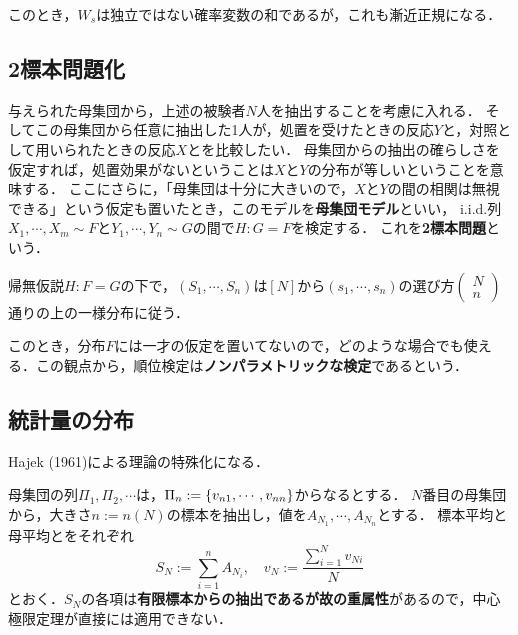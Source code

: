 \documentclass[uplatex,dvipdfmx]{jsreport}
\begin{document}
このとき，$W_s$は独立ではない確率変数の和であるが，これも漸近正規になる．

\subsection{2標本問題化}

与えられた母集団から，上述の被験者$N$人を抽出することを考慮に入れる．
そしてこの母集団から任意に抽出した1人が，処置を受けたときの反応$Y$と，対照として用いられたときの反応$X$とを比較したい．
母集団からの抽出の確らしさを仮定すれば，処置効果がないということは$X$と$Y$の分布が等しいということを意味する．
ここにさらに，「母集団は十分に大きいので，$X$と$Y$の間の相関は無視できる」という仮定も置いたとき，このモデルを\textbf{母集団モデル}といい，
i.i.d.列$X_1,\cdots,X_m\sim F$と$Y_1,\cdots,Y_n\sim G$の間で$H:G=F$を検定する．
これを\textbf{2標本問題}という．

\begin{theorem}
    帰無仮説$H:F=G$の下で，$(S_1,\cdots,S_n)$は$[N]$から$(s_1,\cdots,s_n)$の選び方$\begin{pmatrix}N\\n\end{pmatrix}$通りの上の一様分布に従う．
\end{theorem}

\begin{remark}
    このとき，分布$F$には一才の仮定を置いてないので，どのような場合でも使える．この観点から，順位検定は\textbf{ノンパラメトリックな検定}であるという．
\end{remark}

\subsection{統計量の分布}

\begin{tcolorbox}[colframe=ForestGreen, colback=ForestGreen!10!white,breakable,colbacktitle=ForestGreen!40!white,coltitle=black,fonttitle=\bfseries\sffamily,
title=]
    Hajek (1961)による理論の特殊化になる．
\end{tcolorbox}

\begin{notation}
    母集団の列$\Pi_1,\Pi_2,\cdots$は，$\Pi_n:=\left\{v_{n1},\cdots,v_{nn}\right\}$からなるとする．
    $N$番目の母集団から，大きさ$n:=n(N)$の標本を抽出し，値を$A_{N_1},\cdots,A_{N_n}$とする．
    標本平均と母平均とをそれぞれ
    \[S_N:=\sum_{i=1}^nA_{N_i},\quad v_N:=\frac{\sum_{i=1}^Nv_{Ni}}{N}\]
    とおく．$S_N$の各項は\textbf{有限標本からの抽出であるが故の重属性}があるので，中心極限定理が直接には適用できない．
\end{notation}
\end{document}
